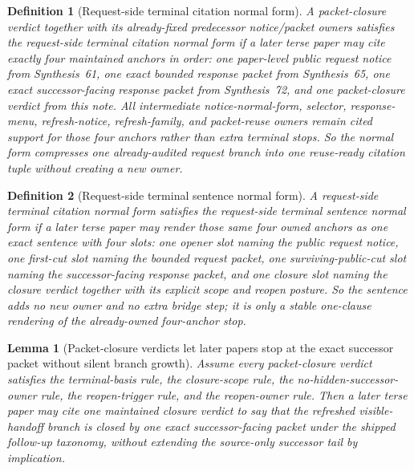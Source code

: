 \documentclass[11pt]{article}
\newtheorem{definition}{Definition}
\newtheorem{lemma}{Lemma}
\begin{document}
\begin{definition}[Request-side terminal citation normal form]
A packet-closure verdict together with its already-fixed predecessor notice/packet owners satisfies the \emph{request-side terminal citation normal form} if a later terse paper may cite exactly four maintained anchors in order: one paper-level public request notice from Synthesis~61, one exact bounded response packet from Synthesis~65, one exact successor-facing response packet from Synthesis~72, and one packet-closure verdict from this note.
All intermediate notice-normal-form, selector, response-menu, refresh-notice, refresh-family, and packet-reuse owners remain cited support for those four anchors rather than extra terminal stops.
So the normal form compresses one already-audited request branch into one reuse-ready citation tuple without creating a new owner.
\end{definition}

\begin{definition}[Request-side terminal sentence normal form]
A request-side terminal citation normal form satisfies the \emph{request-side terminal sentence normal form} if a later terse paper may render those same four owned anchors as one exact sentence with four slots: one opener slot naming the public request notice, one first-cut slot naming the bounded request packet, one surviving-public-cut slot naming the successor-facing response packet, and one closure slot naming the closure verdict together with its explicit scope and reopen posture.
So the sentence adds no new owner and no extra bridge step; it is only a stable one-clause rendering of the already-owned four-anchor stop.
\end{definition}

\begin{lemma}[Packet-closure verdicts let later papers stop at the exact successor packet without silent branch growth]
Assume every packet-closure verdict satisfies the terminal-basis rule, the closure-scope rule, the no-hidden-successor-owner rule, the reopen-trigger rule, and the reopen-owner rule.
Then a later terse paper may cite one maintained closure verdict to say that the refreshed visible-handoff branch is closed by one exact successor-facing packet under the shipped follow-up taxonomy, without extending the source-only successor tail by implication.
\end{lemma}
\end{document}
